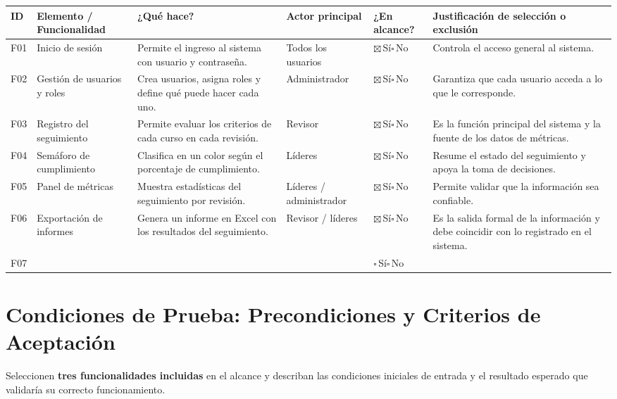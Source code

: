 \documentclass[11pt,letterpaper]{article}
\newcommand{\si}{$\boxtimes$\,Sí\enspace$\square$\,No}
\newcommand{\vacia}{$\square$\,Sí\enspace$\square$\,No}
\begin{document}
\vspace{4pt}
\noindent
{\small
\begin{tabularx}{\textwidth}{@{}P{0.8cm}P{2.6cm}YP{2.3cm}P{2.0cm}Y@{}}
\toprule
\textbf{ID} & \textbf{Elemento / Funcionalidad} & \textbf{¿Qué hace?} & \textbf{Actor principal} & \textbf{¿En alcance?} & \textbf{Justificación de selección o exclusión} \\
\midrule
F01 & Inicio de sesión & Permite el ingreso al sistema con usuario y contraseña. & Todos los usuarios & \si & Controla el acceso general al sistema. \\
\addlinespace
F02 & Gestión de usuarios y roles & Crea usuarios, asigna roles y define qué puede hacer cada uno. & Administrador & \si & Garantiza que cada usuario acceda a lo que le corresponde. \\
\addlinespace
F03 & Registro del seguimiento & Permite evaluar los criterios de cada curso en cada revisión. & Revisor & \si & Es la función principal del sistema y la fuente de los datos de métricas. \\
\addlinespace
F04 & Semáforo de cumplimiento & Clasifica en un color según el porcentaje de cumplimiento. & Líderes & \si & Resume el estado del seguimiento y apoya la toma de decisiones. \\
\addlinespace
F05 & Panel de métricas & Muestra estadísticas del seguimiento por revisión. & Líderes / administrador & \si & Permite validar que la información sea confiable. \\
\addlinespace
F06 & Exportación de informes & Genera un informe en Excel con los resultados del seguimiento. & Revisor / líderes & \si & Es la salida formal de la información y debe coincidir con lo registrado en el sistema. \\
\addlinespace
F07 & & & & \vacia & \\
\bottomrule
\end{tabularx}
}

\newpage
\section{Condiciones de Prueba: Precondiciones y Criterios de Aceptación}
Seleccionen \textbf{tres funcionalidades incluidas} en el alcance y describan las condiciones iniciales de entrada y el resultado esperado que validaría su correcto funcionamiento.
\end{document}
